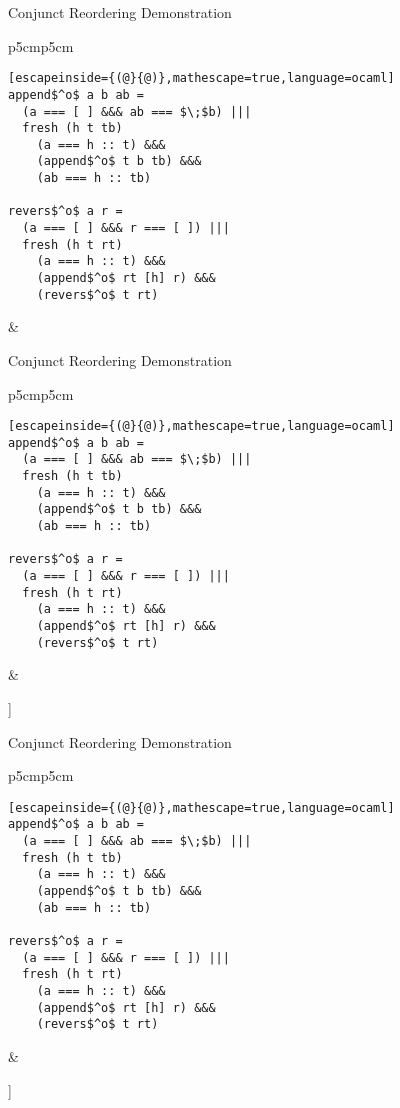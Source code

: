 \documentclass{beamer}
\theoremstyle{definition}
\theoremstyle{plain} %
\begin{document}
\begin{frame}[fragile]{Conjunct Reordering Demonstration}
  \begin{tabular}{p{5cm}p{5cm}}
    \begin{lstlisting}[escapeinside={(@}{@)},mathescape=true,language=ocaml]
append$^o$ a b ab =		
  (a === [ ] &&& ab === $\;$b) |||
  fresh (h t tb) 
    (a === h :: t) &&&
    (append$^o$ t b tb) &&&
    (ab === h :: tb)  
  
revers$^o$ a r =	
  (a === [ ] &&& r === [ ]) |||
  fresh (h t rt) 
    (a === h :: t) &&&
    (append$^o$ rt [h] r) &&&
    (revers$^o$ t rt)
\end{lstlisting}
&
\begin{center}
\end{center}
\end{tabular}
\end{frame}

\begin{frame}[fragile]{Conjunct Reordering Demonstration}
  \begin{tabular}{p{5cm}p{5cm}}
    \begin{lstlisting}[escapeinside={(@}{@)},mathescape=true,language=ocaml]
append$^o$ a b ab =		
  (a === [ ] &&& ab === $\;$b) |||
  fresh (h t tb) 
    (a === h :: t) &&&
    (append$^o$ t b tb) &&&
    (ab === h :: tb)  
  
revers$^o$ a r =	
  (a === [ ] &&& r === [ ]) |||
  fresh (h t rt) 
    (a === h :: t) &&&
    (append$^o$ rt [h] r) &&&
    (revers$^o$ t rt)
\end{lstlisting}
&
\begin{center}
   \Tree [.{\lstinline|revers$^o\; [1,\,2,\,3]\; r$|}  [.{$[1,\,2,\,3]\not\equiv [\;]$} ] [.{$\ldots$} ] ]
\end{center}
\end{tabular}
\end{frame}

\begin{frame}[fragile]{Conjunct Reordering Demonstration}
  \begin{tabular}{p{5cm}p{5cm}}
    \begin{lstlisting}[escapeinside={(@}{@)},mathescape=true,language=ocaml]
append$^o$ a b ab =		
  (a === [ ] &&& ab === $\;$b) |||
  fresh (h t tb) 
    (a === h :: t) &&&
    (append$^o$ t b tb) &&&
    (ab === h :: tb)  
  
revers$^o$ a r =	
  (a === [ ] &&& r === [ ]) |||
  fresh (h t rt) 
    (a === h :: t) &&&
    (append$^o$ rt [h] r) &&&
    (revers$^o$ t rt)
\end{lstlisting}
&
\begin{center}
   \Tree [.{\lstinline|revers$^o\; [1,\,2,\,3]\; r$|}  [.{$[1,\,2,\,3]\not\equiv [\;]$} ] [.{$[1,\,2,\,3]\equiv h_0:t_0$} ] ]
\end{center}
\end{tabular}
\end{frame}
\end{document}
